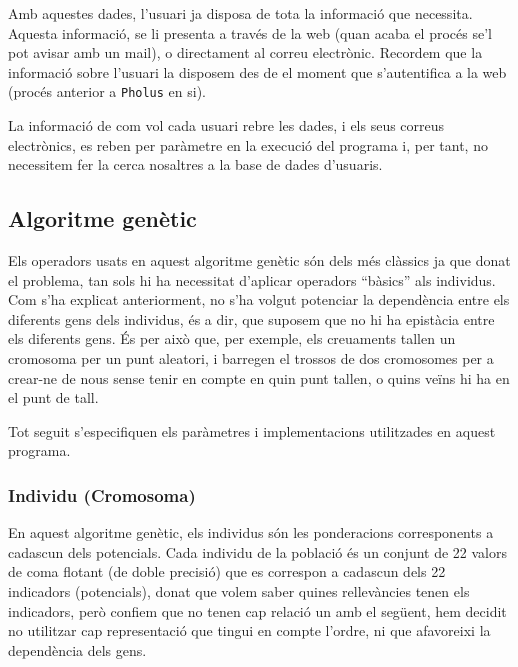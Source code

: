 Amb aquestes dades, l'usuari ja disposa de tota la informació que necessita.
Aquesta informació, se li presenta a través de la web (quan acaba el procés se'l
pot avisar amb un mail), o directament al correu electrònic.  Recordem que la
informació sobre l'usuari la disposem des de el moment que s'autentifica a la web
(procés anterior a \texttt{Pholus} en si).

La informació de com vol cada usuari rebre les dades, i els seus correus
electrònics, es reben per paràmetre en la execució del programa i, per tant, no
necessitem fer la cerca nosaltres a la base de dades d'usuaris.



\subsection{Algoritme genètic} %
\label{sub:Algoritme genetic}

Els operadors usats en aquest algoritme genètic són dels més clàssics ja que
donat el problema, tan sols hi ha necessitat d'aplicar operadors ``bàsics'' als
individus.  Com s'ha explicat anteriorment, no s'ha volgut potenciar la
dependència entre els diferents gens dels individus, és a dir, que suposem que
no hi ha epistàcia entre els diferents gens.  És per això que, per exemple, els
creuaments tallen un cromosoma per un punt aleatori, i barregen el trossos de
dos cromosomes per a crear-ne de nous sense tenir en compte en quin punt tallen,
o quins veïns hi ha en el punt de tall.

Tot seguit s'especifiquen els paràmetres i implementacions utilitzades en aquest
programa.

\subsubsection{Individu (Cromosoma)}
\label{ssub:individu (cromosoma)}

En aquest algoritme genètic, els individus són les ponderacions corresponents a
cadascun dels potencials.  Cada individu de la població és un conjunt de 22 valors de
coma flotant (de doble precisió) que es correspon a cadascun dels 22 indicadors
(potencials),  donat que volem saber quines rellevàncies tenen els indicadors, però
confiem que no tenen cap relació un amb el següent, hem decidit no utilitzar cap
representació que tingui en compte l'ordre, ni que afavoreixi la dependència
dels gens. %

